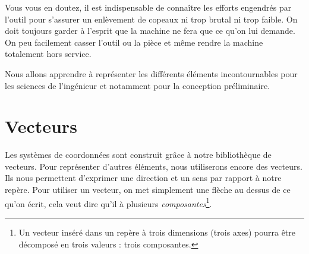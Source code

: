 \documentclass[
	11pt, %
	fleqn, %
	a4paper, %
]{LegrandOrangeBook}
\begin{document}
\begin{figure}[H]  %
	\centering %
\end{figure}

Vous vous en doutez, il est indispensable de connaître les efforts engendrés par l'outil pour s'assurer un enlèvement de copeaux ni trop brutal ni trop faible. On doit toujours garder à l'esprit que la machine ne fera que ce qu'on lui demande. On peu facilement casser l'outil ou la pièce et même rendre la machine totalement hors service.

Nous allons apprendre à représenter les différents éléments incontournables pour les sciences de l'ingénieur et notamment pour la conception préliminaire.







\section{Vecteurs}
Les systèmes de coordonnées sont construit grâce à notre bibliothèque de vecteurs. Pour représenter d'autres éléments, nous utiliserons encore des vecteurs. Ils nous permettent d'exprimer une direction et un sens par rapport à notre repère. Pour utiliser un vecteur, on met simplement une flèche au dessus de ce qu'on écrit, cela veut dire qu'il à plusieurs \textit{composantes}\footnote{Un vecteur inséré dans un repère à trois dimensions (trois axes) pourra être décomposé en trois valeurs : trois composantes.}.\\
\end{document}
